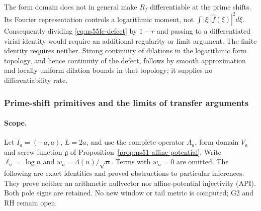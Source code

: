 \documentclass[11pt]{article}
\theoremstyle{remark}
\begin{document}
The form domain does not in general make $R_f$ differentiable at the
prime shifts. Its Fourier representation controls a logarithmic moment,
not $\int|\xi||\widehat f(\xi)|^2d\xi$. Consequently dividing
\eqref{eq:ns55fc-defect} by $1-r$ and passing to a differentiated
virial identity would require an additional regularity or limit
argument. The finite identity requires neither. Strong continuity of
dilations in the logarithmic form topology, and hence continuity of
the defect, follows by smooth approximation and locally uniform
dilation bounds in that topology; it supplies no differentiability rate.


\subsubsection{Prime-shift primitives and the limits of transfer arguments}

\paragraph{Scope.}
Let $I_a=(-a,a)$, $L=2a$, and use the complete operator $A_a$,
form domain $V_a$ and screw function $\mathfrak g$ of
Proposition~\ref{prop:ns51-affine-potential}. Write
$\ell_n=\log n$ and $w_n=\Lambda(n)/\sqrt n$. Terms with
$w_n=0$ are omitted. The following are exact identities and proved
obstructions to particular inferences. They prove neither an arithmetic
nullvector nor affine-potential injectivity (API). Both pole signs are
retained. No new window or tail metric is computed; G2 and RH remain open.
\end{document}
